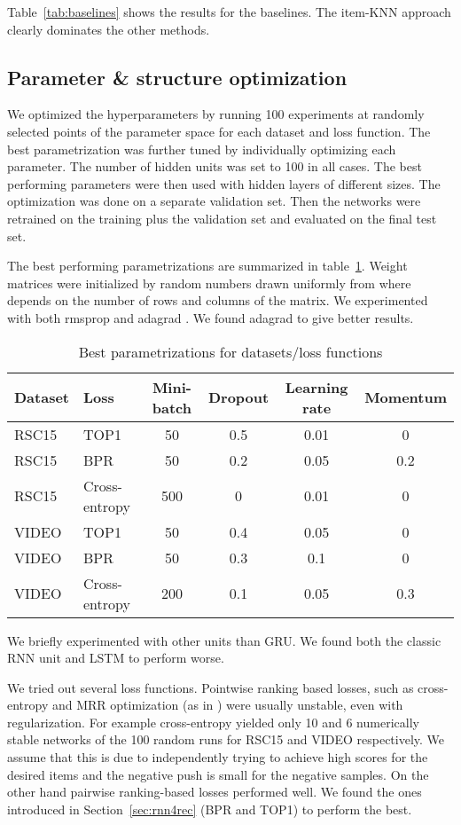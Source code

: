 Table~\ref{tab:baselines} shows the results for the baselines. The item-KNN approach clearly dominates the other methods.

\subsection{Parameter \& structure optimization}
We optimized the hyperparameters by running 100 experiments at randomly selected points of the parameter space for each dataset and loss function. The best parametrization was further tuned by individually optimizing each parameter. The number of hidden units was set to 100 in all cases. The best performing parameters were then used with hidden layers of different sizes. The optimization was done on a separate validation set. Then the networks were retrained on the training plus the validation set and evaluated on the final test set.

The best performing parametrizations are summarized in table~\ref{tab:params}. Weight matrices were initialized by random numbers drawn uniformly from  where  depends on the number of rows and columns of the matrix. We experimented with both rmsprop \citep{rmsprop} and adagrad \citep{adagrad}. We found adagrad to give better results.

\begin{table}
\centering
\caption{Best parametrizations for datasets/loss functions}\label{tab:params}
\medskip
{\small
\begin{tabular}{llcccc}
\toprule
\textbf{Dataset} & \textbf{Loss} & \textbf{Mini-batch} & \textbf{Dropout} & \textbf{Learning rate} & \textbf{Momentum} \\
\midrule
RSC15 & TOP1 & 50 & 0.5 & 0.01 & 0 \\
RSC15 & BPR & 50 & 0.2 & 0.05 & 0.2 \\
RSC15 & Cross-entropy & 500 & 0 & 0.01 & 0 \\
VIDEO & TOP1 & 50 & 0.4 & 0.05 & 0 \\
VIDEO & BPR & 50 & 0.3 & 0.1 & 0 \\
VIDEO & Cross-entropy & 200 & 0.1 & 0.05 & 0.3 \\
\bottomrule
\end{tabular}}
\end{table}

We briefly experimented with other units than GRU. We found both the classic RNN unit and LSTM to perform worse.

We tried out several loss functions. Pointwise ranking based losses, such as cross-entropy and MRR optimization (as in \citet{gaussian_ranking}) were usually unstable, even with regularization. For example cross-entropy yielded only 10 and 6 numerically stable networks of the 100 random runs for RSC15 and VIDEO respectively. We assume that this is due to independently trying to achieve high scores for the desired items and the negative push is small for the negative samples. On the other hand pairwise ranking-based losses performed well. We found the ones introduced in Section~\ref{sec:rnn4rec} (BPR and TOP1) to perform the best.

